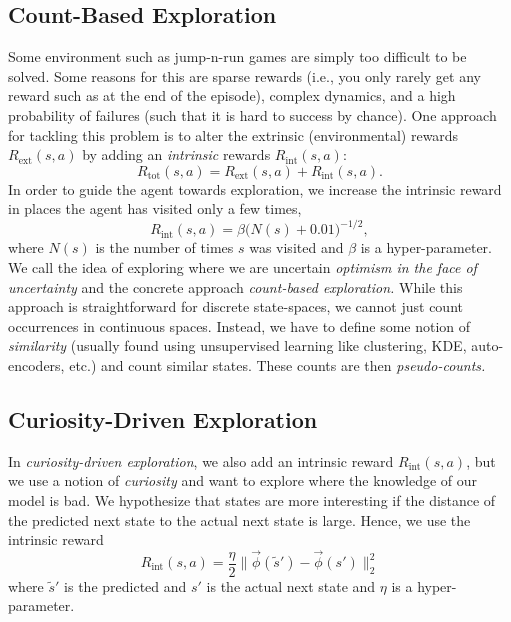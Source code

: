 		\subsection{Count-Based Exploration}
			Some environment such as jump-n-run games are simply too difficult to be solved. Some reasons for this are sparse rewards (i.e., you only rarely get any reward such as at the end of the episode), complex dynamics, and a high probability of failures (such that it is hard to success by chance). One approach for tackling this problem is to alter the extrinsic (environmental) rewards \(R_\mathrm{ext}(s, a)\) by adding an \emph{intrinsic} rewards \(R_\mathrm{int}(s, a)\):
			\begin{equation}
				R_\mathrm{tot}(s, a) = R_\mathrm{ext}(s, a) + R_\mathrm{int}(s, a).
			\end{equation}
			In order to guide the agent towards exploration, we increase the intrinsic reward in places the agent has visited only a few times,
			\begin{equation}
				R_\mathrm{int}(s, a) = \beta \bigl( N(s) + 0.01 \bigr)^{-1/2},
			\end{equation}
			where \(N(s)\) is the number of times \(s\) was visited and \(\beta\) is a hyper-parameter. We call the idea of exploring where we are uncertain \emph{optimism in the face of uncertainty} and the concrete approach \emph{count-based exploration.} While this approach is straightforward for discrete state-spaces, we cannot just count occurrences in continuous spaces. Instead, we have to define some notion of \emph{similarity} (usually found using unsupervised learning like clustering, \ac{KDE}, auto-encoders, etc.) and count similar states. These counts are then \emph{pseudo-counts.}

		\subsection{Curiosity-Driven Exploration}
			In \emph{curiosity-driven exploration}, we also add an intrinsic reward \(R_\mathrm{int}(s, a)\), but we use a notion of \emph{curiosity} and want to explore where the knowledge of our model is bad. We hypothesize that states are more interesting if the distance of the predicted next state to the actual next state is large. Hence, we use the intrinsic reward
			\begin{equation}
				R_\mathrm{int}(s, a) = \frac{\eta}{2} \bigl\lVert \vec{\phi}(\tilde{s}') - \vec{\phi}(s') \bigr\lVert_2^2
			\end{equation}
			where \(\tilde{s}'\) is the predicted and \(s'\) is the actual next state and \(\eta\) is a hyper-parameter.

